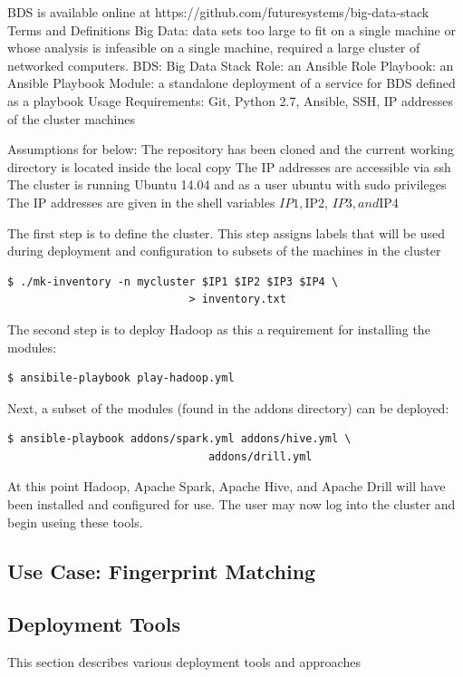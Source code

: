BDS is available online at https://github.com/futuresystems/big-data-stack
Terms and Definitions
Big Data: data sets too large to fit on a single machine or whose analysis is infeasible on a single machine, required a large cluster of networked computers.
BDS: Big Data Stack
Role: an Ansible Role
Playbook: an Ansible Playbook
Module: a standalone deployment of a service for BDS defined as a playbook
Usage
Requirements: Git, Python 2.7, Ansible, SSH, IP addresses of the cluster machines

Assumptions for below:
The repository has been cloned and the current working directory is located inside the local copy
The IP addresses are accessible via ssh
The cluster is running Ubuntu 14.04 and as a user ubuntu with sudo privileges
The IP addresses are given in the shell variables $IP1, $IP2, $IP3, and $IP4

The first step is to define the cluster. This step assigns labels that will be used during deployment and configuration to subsets of the machines in the cluster

\begin{Verbatim}[fontfamily=helvetica]
$ ./mk-inventory -n mycluster $IP1 $IP2 $IP3 $IP4 \
                            > inventory.txt
\end{Verbatim}

The second step is to deploy Hadoop as this a requirement for installing the modules:

\begin{Verbatim}[fontfamily=helvetica]
$ ansibile-playbook play-hadoop.yml
\end{Verbatim}

Next, a subset of the modules (found in the addons directory) can be deployed:

\begin{Verbatim}[fontfamily=helvetica]
$ ansible-playbook addons/spark.yml addons/hive.yml \
                               addons/drill.yml
\end{Verbatim}

At this point Hadoop, Apache Spark, Apache Hive, and Apache Drill will have been installed and configured for use. The user may now log into the cluster and begin useing these tools.


\subsection{Use Case: Fingerprint Matching}

\subsection{Deployment Tools}
This section describes various deployment tools and approaches

